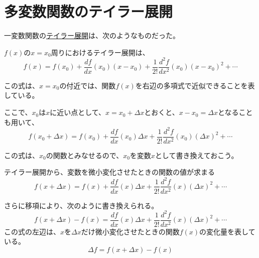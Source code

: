 \documentclass[../../../topic_calculus]{subfiles}
\begin{document}
\sectionline
\section{多変数関数のテイラー展開}

一変数関数の\hyperref[thm:taylor-expansion]{テイラー展開}は、次のようなものだった。

\begin{review}
  $f(x)$の$x = x_0$周りにおけるテイラー展開は、
  \begin{equation*}
  f(x) = f(x_0) + \frac{df}{dx}(x_0)(x - x_0) + \frac{1}{2!}\frac{d^2 f}{dx^2}(x_0)(x - x_0)^2 + \cdots
\end{equation*}
\end{review}

この式は、$x=x_0$の付近では、関数$f(x)$を右辺の多項式で近似できることを表している。

\br

ここで、$x_0$は$x$に近い点として、$x = x_0 + \Delta x$とおくと、$x - x_0 = \Delta x$となることも用いて、
\begin{equation*}
  f(x_0 + \Delta x) = f(x_0) + \frac{df}{dx}(x_0)\Delta x + \frac{1}{2!}\frac{d^2 f}{dx^2}(x_0)(\Delta x)^2 + \cdots
\end{equation*}

この式は、$x_0$の関数とみなせるので、$x_0$を変数$x$として書き換えておこう。

\begin{emphabox}
  \begin{spacebox}
    \begin{center}
      テイラー展開から、変数を微小変化させたときの関数の値が求まる
      \begin{equation*}
  f(x + \Delta x) = f(x) + \frac{df}{dx}(x)\Delta x + \frac{1}{2!}\frac{d^2 f}{dx^2}(x)(\Delta x)^2 + \cdots
\end{equation*}
    \end{center}
  \end{spacebox}
\end{emphabox}

さらに移項により、次のように書き換えられる。
\begin{equation*}
  f(x + \Delta x) - f(x) = \frac{df}{dx}(x)\Delta x + \frac{1}{2!}\frac{d^2 f}{dx^2}(x)(\Delta x)^2 + \cdots
\end{equation*}
この式の左辺は、$x$を$\Delta x$だけ微小変化させたときの関数$f(x)$の変化量を表している。
\begin{equation*}
  \Delta f = f(x + \Delta x) - f(x)
\end{equation*}
\end{document}
